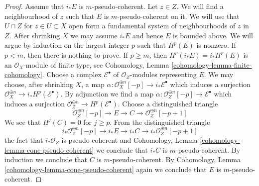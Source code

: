 \begin{proof}
\medskip\noindent
Assume that $i_*E$ is $m$-pseudo-coherent. Let $z \in Z$.
We will find a neighbourhood of $z$ such that $E$
is $m$-pseudo-coherent on it. We will use
that $U \cap Z$ for $z \in U \subset X$ open form a fundamental system of
neighbourhoods of $z$ in $Z$. After shrinking $X$ we may assume $i_*E$
and hence $E$ is bounded above. We will argue by induction on
the largest integer $p$ such that $H^p(E)$ is nonzero. If $p < m$, then
there is nothing to prove. If $p \geq m$, then $H^p(i_*E) = i_*H^p(E)$
is an $\mathcal{O}_X$-module of finite type, see
Cohomology, Lemma \ref{cohomology-lemma-finite-cohomology}.
Choose a complex $\mathcal{E}^\bullet$ of $\mathcal{O}_Z$-modules
representing $E$. We may choose, after shrinking $X$,
a map $\alpha : \mathcal{O}_X^{\oplus n}[-p] \to i_*\mathcal{E}^\bullet$
which induces a surjection
$\mathcal{O}_X^{\oplus n} \to i_*H^p(\mathcal{E}^\bullet)$.
By adjunction we find a map
$\alpha : \mathcal{O}_Z^{\oplus n}[-p] \to \mathcal{E}^\bullet$
which induces a surjection
$\mathcal{O}_Z^{\oplus n} \to H^p(\mathcal{E}^\bullet)$.
Choose a distinguished triangle
$$
\mathcal{O}_Z^{\oplus n}[-p] \to E \to C \to \mathcal{O}_Z^{\oplus n}[-p + 1]
$$
We see that $H^j(C) = 0$ for $j \geq p$. From the distinguished triangle
$$
i_*\mathcal{O}_Z^{\oplus n}[-p] \to i_*E \to i_*C \to
i_*\mathcal{O}_Z^{\oplus n}[-p + 1]
$$
the fact that $i_*\mathcal{O}_Z$ is pseudo-coherent
and 
Cohomology, Lemma \ref{cohomology-lemma-cone-pseudo-coherent}
we conclude that $i_*C$ is $m$-pseudo-coherent.
By induction we conclude that $C$ is $m$-pseudo-coherent.
By Cohomology, Lemma \ref{cohomology-lemma-cone-pseudo-coherent}
again we conclude that $E$ is $m$-pseudo-coherent.
\end{proof}